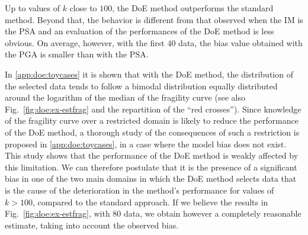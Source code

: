 {Up to values of $k$ close to $100$, the DoE method outperforms the standard method. Beyond that, the behavior is different from that observed when the IM is the PSA and an evaluation of the performances of the DoE method is less obvious. On average, however, with the first $40$ data, the bias value obtained with the PGA is smaller than with the PSA.}


{In \ref{app:doe:toycases} it is shown that with the DoE method, the distribution of the selected data tends to follow a bimodal distribution equally distributed around the logarithm of the median of the fragility curve (see also Fig.~\ref{fig:doe:ex-estfrag} and the repartition of the ``red crosses''). Since knowledge of the fragility curve over a restricted domain is likely to reduce the performance of the DoE method, a thorough study of the consequences of such a restriction is proposed in \ref{app:doe:toycases}, in a case where the model bias does not exist. This study shows that the performance of the DoE method is weakly affected by this limitation. We can therefore postulate that it is the presence of a significant bias in one of the two main domains in which the DoE method selects data that is the cause of the deterioration in the method's performance for values of $k > 100$, compared to the standard approach. If we believe the results in Fig.~\ref{fig:doe:ex-estfrag}, with $80$ data, we obtain however a completely reasonable estimate, taking into account the observed bias.}

